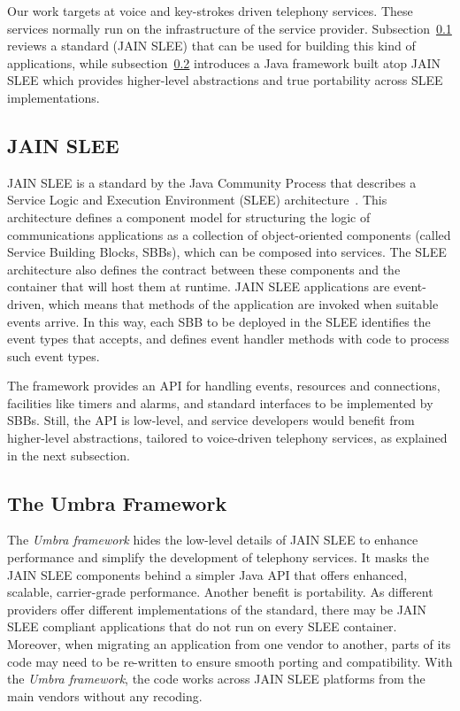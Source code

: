 Our work targets at voice and key-strokes driven telephony services. These services normally run on the
infrastructure of the service provider. Subsection~\ref{sec:JSLEE} reviews a standard (JAIN SLEE) that can be used for building
this kind of applications, while subsection~\ref{sec:umbra-framework} introduces a Java framework built atop JAIN SLEE
which provides higher-level abstractions and true portability across SLEE implementations.

\subsection{JAIN SLEE}\label{sec:JSLEE}

JAIN SLEE is a standard by the Java Community Process that describes
a Service Logic and Execution Environment (SLEE) architecture~\cite{JAINSLEE}.
This architecture defines a component model for structuring the logic of communications applications
as a collection of object-oriented components (called Service Building Blocks, SBBs), which can be composed into
services. The SLEE architecture also defines the contract between these components
and the container that will host them at runtime. 
JAIN SLEE applications are event-driven, which means that methods of the application are invoked when
suitable events arrive. In this way, each SBB to be deployed in the SLEE identifies the event types 
that accepts, and defines event handler methods with code to process such event types. 

The framework provides an API for handling events, resources and connections, facilities like timers 
and alarms, and standard interfaces to be implemented by SBBs. Still, the API is low-level, and 
service developers would benefit from higher-level abstractions, tailored to voice-driven telephony 
services, as explained in the next subsection.

\subsection{The Umbra Framework}\label{sec:umbra-framework}

The {\em Umbra framework} hides the low-level details of JAIN SLEE to enhance performance and simplify 
the development of telephony services. It masks the JAIN SLEE components behind a simpler Java API that offers 
enhanced, scalable, carrier-grade performance. Another benefit is portability. As different providers offer 
different implementations of the standard, there may be JAIN SLEE compliant applications that do not run 
on every SLEE container. Moreover, when migrating an application from one vendor to another, parts
of its code may need to be re-written to ensure smooth porting and compatibility. With the {\em Umbra 
framework}, the code works across JAIN SLEE platforms from the main vendors without any recoding.

